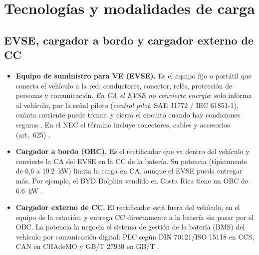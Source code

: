 \section{Tecnologías y modalidades de carga}
\label{sec:tecnologias}

\subsection{EVSE, cargador a bordo y cargador externo de CC}
\begin{itemize}
\item \textbf{Equipo de suministro para VE (EVSE).} Es el equipo fijo o portátil que conecta el vehículo a la red: conductores, conector, relés, protección de personas y comunicación. \emph{En CA el EVSE no convierte energía}: solo informa al vehículo, por la señal piloto (\emph{control pilot}, SAE J1772 / IEC 61851-1), cuánta corriente puede tomar, y cierra el circuito cuando hay condiciones seguras \cite{iec61851,sae1772}. En el NEC el término incluye conectores, cables y accesorios (art.~625) \cite{nfpa70}.
\item \textbf{Cargador a bordo (OBC).} Es el rectificador que va dentro del vehículo y convierte la CA del EVSE en la CC de la batería. Su potencia (típicamente de 6,6 a \SI{19.2}{\kilo\watt}) limita la carga en CA, aunque el EVSE pueda entregar más. Por ejemplo, el BYD Dolphin vendido en Costa Rica tiene un OBC de \SI{6.6}{\kilo\watt} \cite{bydDolphin}.
\item \textbf{Cargador externo de CC.} El rectificador está fuera del vehículo, en el equipo de la estación, y entrega CC directamente a la batería sin pasar por el OBC. La potencia la negocia el sistema de gestión de la batería (BMS) del vehículo por comunicación digital: PLC según DIN 70121/ISO 15118 en CCS, CAN en CHAdeMO y GB/T 27930 en GB/T \cite{autelDC,zerova}.
\end{itemize}

